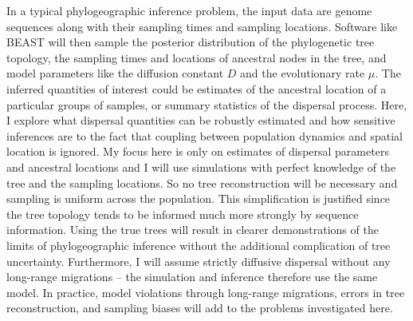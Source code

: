 \documentclass[aps,rmp, twocolumn]{revtex4}
\begin{document}
In a typical phylogeographic inference problem, the input data are genome sequences along with their sampling times and sampling locations.
Software like BEAST will then sample the posterior distribution of the phylogenetic tree topology, the sampling times and locations of ancestral nodes in the tree, and model parameters like the diffusion constant $D$ and the evolutionary rate $\mu$.
The inferred quantities of interest could be estimates of the ancestral location of a particular groups of samples, or summary statistics of the dispersal process.
Here, I explore what dispersal quantities can be robustly estimated and how sensitive inferences are to the fact that coupling between population dynamics and spatial location is ignored.
My focus here is only on estimates of dispersal parameters and ancestral locations and I will use simulations with perfect knowledge of the tree and the sampling locations.
So no tree reconstruction will be necessary and sampling is uniform across the population.
This simplification is justified since the tree topology tends to be informed much more strongly by sequence information.
Using the true trees will result in clearer demonstrations of the limits of phylogeographic inference without the additional complication of tree uncertainty.
Furthermore, I will assume strictly diffusive dispersal without any long-range migrations -- the simulation and inference therefore use the same model.
In practice, model violations through long-range migrations, errors in tree reconstruction, and sampling biases will add to the problems investigated here.
\end{document}
